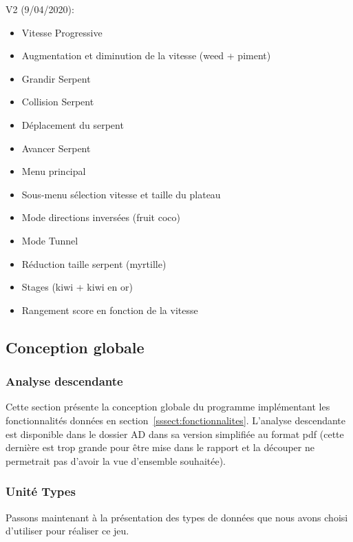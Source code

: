 \documentclass[11pt,a4paper]{article}
\begin{document}
            V2 (9/04/2020):
            \\
            \begin{itemize}
                \item Vitesse Progressive
                \item Augmentation et diminution de la vitesse (weed + piment)
                \item Grandir Serpent
                \item Collision Serpent 
                \item Déplacement du serpent
                \item Avancer Serpent
                \item Menu principal
                \item Sous-menu sélection vitesse et taille du plateau
                \item Mode directions inversées (fruit coco)
                \item Mode Tunnel
                \item Réduction taille serpent (myrtille)
                \item Stages (kiwi + kiwi en or)
                \item Rangement score en fonction de la vitesse
            \end{itemize}

    \subsection{Conception globale}
    
        \subsubsection{Analyse descendante}
        Cette section présente la conception globale du programme implémentant les fonctionnalités données en section~\ref{sssect:fonctionnalites}.
        L'analyse descendante est disponible dans le dossier AD dans sa version simplifiée au format pdf (cette dernière est trop grande pour être mise dans le rapport et la découper ne permetrait pas d'avoir la vue d'ensemble souhaitée).
        \newpage
        
        
        \subsubsection{Unité Types}
        Passons maintenant à la présentation des types de données que nous avons choisi d'utiliser pour réaliser ce jeu.\\ 
        
\end{document}
